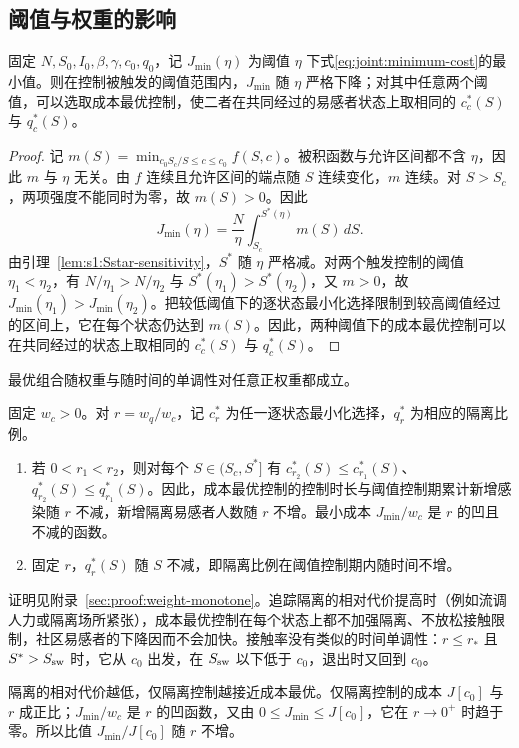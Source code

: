 \subsection{阈值与权重的影响}
\label{sec:joint:cost-sensitivity}
\begin{proposition}
\label{prop:joint:minimum-threshold}
固定 $N,S_0,I_0,\beta,\gamma,c_0,q_0$，记 $J_{\min}(\eta)$ 为阈值 $\eta$ 下式\eqref{eq:joint:minimum-cost}的最小值。则在控制被触发的阈值范围内，$J_{\min}$ 随 $\eta$ 严格下降；对其中任意两个阈值，可以选取成本最优控制，使二者在共同经过的易感者状态上取相同的 $c_c^*(S)$ 与 $q_c^*(S)$。
\end{proposition}
\begin{proof}
记 $m(S)=\min_{c_0S_c/S\le c\le c_0}f(S,c)$。被积函数与允许区间都不含 $\eta$，因此 $m$ 与 $\eta$ 无关。由 $f$ 连续且允许区间的端点随 $S$ 连续变化，$m$ 连续。对 $S>S_c$，两项强度不能同时为零，故 $m(S)>0$。因此
\[
J_{\min}(\eta)=\frac{N}{\eta}\int_{S_c}^{S^*(\eta)}m(S)\,dS.
\]
由引理~\ref{lem:s1:Sstar-sensitivity}，$S^*$ 随 $\eta$ 严格减。对两个触发控制的阈值 $\eta_1<\eta_2$，有 $N/\eta_1>N/\eta_2$ 与 $S^*(\eta_1)>S^*(\eta_2)$，又 $m>0$，故 $J_{\min}(\eta_1)>J_{\min}(\eta_2)$。把较低阈值下的逐状态最小化选择限制到较高阈值经过的区间上，它在每个状态仍达到 $m(S)$。因此，两种阈值下的成本最优控制可以在共同经过的状态上取相同的 $c_c^*(S)$ 与 $q_c^*(S)$。
\end{proof}

最优组合随权重与随时间的单调性对任意正权重都成立。
\begin{proposition}
\label{prop:joint:weight-monotone}
固定 $w_c>0$。对 $r=w_q/w_c$，记 $c_r^*$ 为任一逐状态最小化选择，$q_r^*$ 为相应的隔离比例。
\begin{enumerate}
\renewcommand{\labelenumi}{(\roman{enumi})}
\item 若 $0<r_1<r_2$，则对每个 $S\in(S_c,S^*]$ 有 $c_{r_2}^*(S)\le c_{r_1}^*(S)$、$q_{r_2}^*(S)\le q_{r_1}^*(S)$。因此，成本最优控制的控制时长与阈值控制期累计新增感染随 $r$ 不减，新增隔离易感者人数随 $r$ 不增。最小成本 $J_{\min}/w_c$ 是 $r$ 的凹且不减的函数。
\item 固定 $r$，$q_r^*(S)$ 随 $S$ 不减，即隔离比例在阈值控制期内随时间不增。
\end{enumerate}
\end{proposition}
证明见附录~\ref{sec:proof:weight-monotone}。追踪隔离的相对代价提高时（例如流调人力或隔离场所紧张），成本最优控制在每个状态上都不加强隔离、不放松接触限制，社区易感者的下降因而不会加快。接触率没有类似的时间单调性：$r\le r_*$ 且 $S^*>S_{\rm sw}$ 时，它从 $c_0$ 出发，在 $S_{\rm sw}$ 以下低于 $c_0$，退出时又回到 $c_0$。

隔离的相对代价越低，仅隔离控制越接近成本最优。仅隔离控制的成本 $J[c_0]$ 与 $r$ 成正比；$J_{\min}/w_c$ 是 $r$ 的凹函数，又由 $0\le J_{\min}\le J[c_0]$，它在 $r\to0^{+}$ 时趋于零。所以比值 $J_{\min}/J[c_0]$ 随 $r$ 不增。

\FloatBarrier

